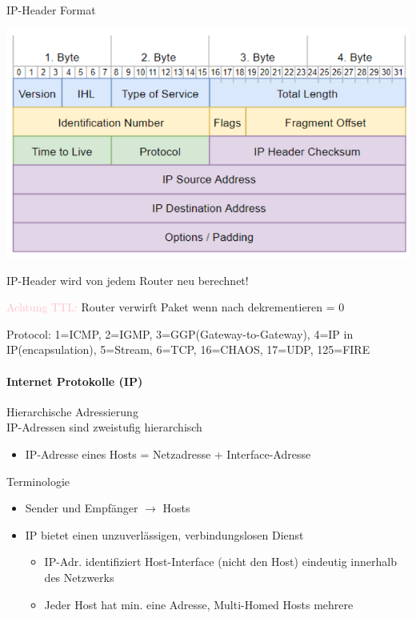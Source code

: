 \begin{KR}{IP-Header Format}
\begin{itemize}
    \end{itemize}
        \includegraphics[width=1\linewidth, height=0.35\linewidth]{images/internet_protokoll_format_ip.png}\\
    {\small IP-Header wird von jedem Router neu berechnet!

    \vspace{1mm}

    \textcolor{pink}{Achtung TTL:} Router verwirft Paket wenn nach dekrementieren = 0
    
    \vspace{1mm}

    Protocol: 1=ICMP, 2=IGMP, 3=GGP(Gateway-to-Gateway), 4=IP in IP(encapsulation), 5=Stream, 6=TCP, 16=CHAOS, 17=UDP, 125=FIRE
    }
\end{KR}

\paragraph{Internet Protokolle (IP)}

\begin{definition}{Hierarchische Adressierung}\\
IP-Adressen sind zweistufig hierarchisch
\begin{itemize}
    \item IP-Adresse eines Hosts = Netzadresse + Interface-Adresse
\end{itemize}
\end{definition}

\begin{definition}{Terminologie}
    \begin{itemize}
        \item Sender und Empfänger $\rightarrow$ Hosts
        \item IP bietet einen unzuverlässigen, verbindungslosen Dienst
        \begin{itemize}
            \item IP-Adr. identifiziert Host-Interface (nicht den Host) eindeutig innerhalb des Netzwerks
            \item Jeder Host hat min. eine Adresse, Multi-Homed Hosts mehrere
        \end{itemize}
    \end{itemize}
\end{definition}

